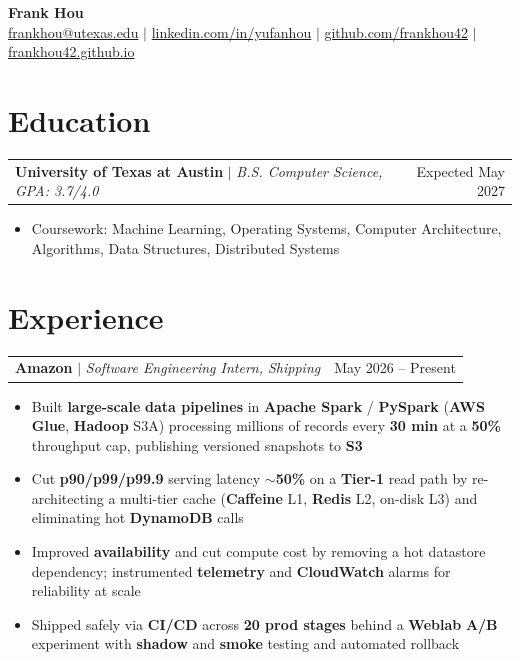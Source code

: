 \documentclass[letterpaper,10pt]{article}
\makeatletter
\newcommand{\resumeWorkHeading}[2]{%
  \vspace{2pt}\noindent
  \begin{tabular*}{\textwidth}{@{}l@{\extracolsep{\fill}}r@{}}
    #1 & #2 \\
  \end{tabular*}%
  \vspace{-2pt}
}
\newcommand{\resumeItemListStart}{\begin{itemize}}
\newcommand{\resumeItemListEnd}{\end{itemize}\vspace{3pt}}
\newcommand{\resumeItem}[1]{\item #1}
\makeatother
\begin{document}
\begin{center}
  {\huge \textbf{Frank Hou}} \\[2pt]
  \small
  \href{mailto:frankhou@utexas.edu}{frankhou@utexas.edu} $|$
  \href{https://linkedin.com/in/yufanhou}{linkedin.com/in/yufanhou} $|$
  \href{https://github.com/frankhou42}{github.com/frankhou42} $|$
  \href{https://frankhou42.github.io/}{frankhou42.github.io}
\end{center}
\vspace{-4pt}

\section{Education}
\resumeWorkHeading
{\textbf{University of Texas at Austin} $|$ \emph{B.S. Computer Science, GPA: 3.7/4.0}}{Expected May 2027}
\resumeItemListStart
\resumeItem{Coursework: Machine Learning, Operating Systems, Computer Architecture, Algorithms, Data Structures, Distributed Systems}
\resumeItemListEnd

\section{Experience}
\resumeWorkHeading
{\textbf{Amazon} $|$ \emph{Software Engineering Intern, Shipping}}{May 2026 -- Present}
\resumeItemListStart
\resumeItem{Built \textbf{large-scale} \textbf{data pipelines} in \textbf{Apache Spark} / \textbf{PySpark} (\textbf{AWS Glue}, \textbf{Hadoop} S3A) processing millions of records every \textbf{30 min} at a \textbf{50\%} throughput cap, publishing versioned snapshots to \textbf{S3}}
\resumeItem{Cut \textbf{p90/p99/p99.9} serving latency \textbf{$\sim$50\%} on a \textbf{Tier-1} read path by re-architecting a multi-tier cache (\textbf{Caffeine} L1, \textbf{Redis} L2, on-disk L3) and eliminating hot \textbf{DynamoDB} calls}
\resumeItem{Improved \textbf{availability} and cut compute cost by removing a hot datastore dependency; instrumented \textbf{telemetry} and \textbf{CloudWatch} alarms for reliability at scale}
\resumeItem{Shipped safely via \textbf{CI/CD} across \textbf{20 prod stages} behind a \textbf{Weblab} \textbf{A/B} experiment with \textbf{shadow} and \textbf{smoke} testing and automated rollback}
\resumeItemListEnd
\end{document}
